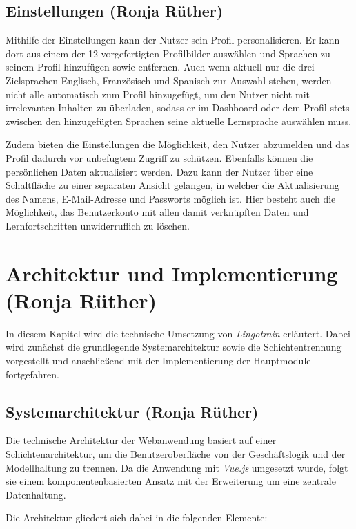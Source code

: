 \subsection{Einstellungen (Ronja Rüther)}
Mithilfe der Einstellungen kann der Nutzer sein Profil personalisieren. Er kann dort aus einem der 12 vorgefertigten Profilbilder auswählen und Sprachen zu seinem Profil 
hinzufügen sowie entfernen. Auch wenn aktuell nur die drei Zielsprachen Englisch, Französisch und Spanisch zur Auswahl stehen, werden nicht alle automatisch zum Profil 
hinzugefügt, um den Nutzer nicht mit irrelevanten Inhalten zu überladen, sodass er im Dashboard oder dem Profil stets zwischen den hinzugefügten 
Sprachen seine aktuelle Lernsprache auswählen muss.

Zudem bieten die Einstellungen die Möglichkeit, den Nutzer abzumelden und das Profil dadurch vor unbefugtem Zugriff zu schützen. Ebenfalls können die persönlichen Daten aktualisiert werden. 
Dazu kann der Nutzer über eine Schaltfläche zu einer separaten Ansicht gelangen,
in welcher die Aktualisierung des Namens, E-Mail-Adresse und Passworts möglich ist. Hier besteht auch die Möglichkeit, das Benutzerkonto mit allen damit verknüpften Daten
und Lernfortschritten unwiderruflich zu löschen.

\section{Architektur und Implementierung (Ronja Rüther)}
In diesem Kapitel wird die technische Umsetzung von \textit{Lingotrain} erläutert. Dabei wird zunächst die grundlegende Systemarchitektur sowie die Schichtentrennung vorgestellt und anschließend mit der 
Implementierung der Hauptmodule fortgefahren.

\subsection{Systemarchitektur (Ronja Rüther)}
Die technische Architektur der Webanwendung basiert auf einer Schichtenarchitektur, um die Benutzeroberfläche von der Geschäftslogik und der Modellhaltung zu trennen.
Da die Anwendung mit \textit{Vue.js} umgesetzt wurde, folgt sie einem komponentenbasierten Ansatz mit der Erweiterung um eine zentrale Datenhaltung.

Die Architektur gliedert sich dabei in die folgenden Elemente:

